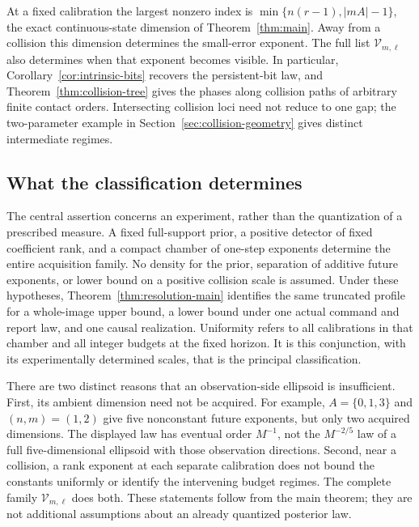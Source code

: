 

At a fixed calibration the largest nonzero index is
$\min\{n(r-1),|mA|-1\}$, the exact continuous-state dimension of
Theorem~\ref{thm:main}. Away from a collision this dimension determines
the small-error exponent. The full list $\mathcal V_{m,\ell}$ also
determines when that exponent becomes visible. In particular,
Corollary~\ref{cor:intrinsic-bits} recovers the persistent-bit law, and
Theorem~\ref{thm:collision-tree} gives the phases along collision paths
of arbitrary finite contact orders. Intersecting collision loci need
not reduce to one gap; the two-parameter example in
Section~\ref{sec:collision-geometry} gives distinct intermediate regimes.

\subsection{What the classification determines}
\label{sec:contribution-v23}
The central assertion concerns an experiment, rather than the
quantization of a prescribed measure. A fixed full-support prior, a
positive detector of fixed coefficient rank, and a compact chamber of
one-step exponents determine the entire acquisition family. No density
for the prior, separation of additive future exponents, or lower bound
on a positive collision scale is assumed. Under these hypotheses,
Theorem~\ref{thm:resolution-main} identifies the same truncated profile
for a whole-image upper bound, a lower bound under one actual command
and report law, and one causal realization. Uniformity refers to all
calibrations in that chamber and all integer budgets at the fixed
horizon. It is this conjunction, with its experimentally determined
scales, that is the principal classification.

There are two distinct reasons that an observation-side ellipsoid is
insufficient. First, its ambient dimension need not be acquired. For
example, $A=\{0,1,3\}$ and $(n,m)=(1,2)$ give five nonconstant
future exponents, but only two acquired dimensions. The displayed law
has eventual order $M^{-1}$, not the $M^{-2/5}$ law of a full
five-dimensional ellipsoid with those observation directions. Second,
near a collision, a rank exponent at each separate calibration does
not bound the constants uniformly or identify the intervening budget
regimes. The complete family $\mathcal V_{m,\ell}$ does both.
These statements follow from the main theorem; they are not additional
assumptions about an already quantized posterior law.

